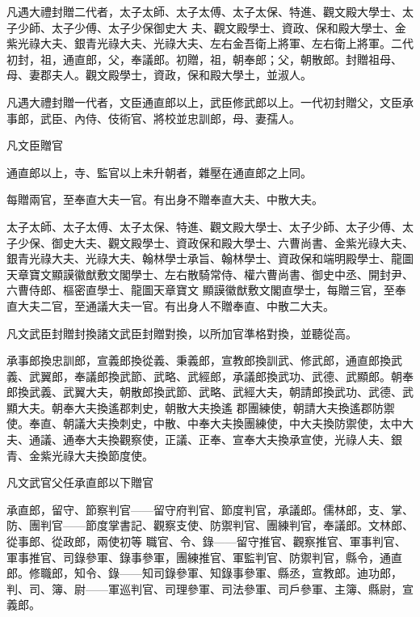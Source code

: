 \begin{pinyinscope}
 凡遇大禮封贈二代者，太子太師、太子太傅、太子太保、特進、觀文殿大學士、太子少師、太子少傅、太子少保御史大
 夫、觀文殿學士、資政、保和殿大學士、金紫光祿大夫、銀青光祿大夫、光祿大夫、左右金吾衛上將軍、左右衛上將軍。二代初封，祖，通直郎，父，奉議郎。初贈，祖，朝奉郎；父，朝散郎。封贈祖母、母、妻郡夫人。觀文殿學士，資政，保和殿大學土，並淑人。



 凡遇大禮封贈一代者，文臣通直郎以上，武臣修武郎以上。一代初封贈父，文臣承事郎，武臣、內侍、伎術官、將校並忠訓郎，母、妻孺人。



 凡文臣贈官



 通直郎以上，寺、監官以上未升朝者，雜壓在通直郎之上同。



 每贈兩官，至奉直大夫一官。有出身不贈奉直大夫、中散大夫。



 太子太師、太子太傅、太子太保、特進、觀文殿大學士、太子少師、太子少傅、太子少保、御史大夫、觀文殿學士、資政保和殿大學士、六曹尚書、金紫光祿大夫、銀青光祿大夫、光祿大夫、翰林學士承旨、翰林學士、資政保和端明殿學士、龍圖天章寶文顯謨徽猷敷文閣學士、左右散騎常侍、權六曹尚書、御史中丞、開封尹、六曹侍郎、樞密直學士、龍圖天章寶文
 顯謨徽猷敷文閣直學士，每贈三官，至奉直大夫二官，至通議大夫一官。有出身人不贈奉直、中散二大夫。



 凡文武臣封贈封換諸文武臣封贈對換，以所加官準格對換，並聽從高。



 承事郎換忠訓郎，宣義郎換從義、秉義郎，宣教郎換訓武、修武郎，通直郎換武義、武翼郎，奉議郎換武節、武略、武經郎，承議郎換武功、武德、武顯郎。朝奉郎換武義、武翼大夫，朝散郎換武節、武略、武經大夫，朝請郎換武功、武德、武顯大夫。朝奉大夫換遙郡刺史，朝散大夫換遙
 郡團練使，朝請大夫換遙郡防禦使。奉直、朝議大夫換刺史，中散、中奉大夫換團練使，中大夫換防禦使，太中大夫、通議、通奉大夫換觀察使，正議、正奉、宣奉大夫換承宣使，光祿人夫、銀青、金紫光祿大夫換節度使。



 凡文武官父任承直郎以下贈官



 承直郎，留守、節察判官——留守府判官、節度判官，承議郎。儒林郎，支、掌、防、團判官——節度掌書記、觀察支使、防禦判官、團練判官，奉議郎。文林郎、從事郎、從政郎，兩使初等
 職官、令、錄——留守推官、觀察推官、軍事判官、軍事推官、司錄參軍、錄事參軍，團練推官、軍監判官、防禦判官，縣令，通直郎。修職郎，知令、錄——知司錄參軍、知錄事參軍、縣丞，宣教郎。迪功郎，判、司、簿、尉——軍巡判官、司理參軍、司法參軍、司戶參軍、主簿、縣尉，宣義郎。




\end{pinyinscope}
